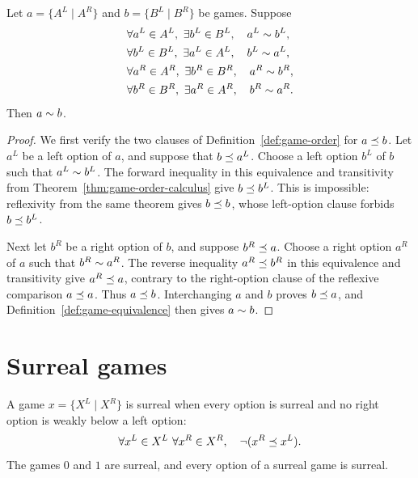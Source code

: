 \begin{theorem}
  \label{thm:option-extensionality}
  \leanok
  Let \(a=\{A^L\mid A^R\}\) and \(b=\{B^L\mid B^R\}\) be games.  Suppose
  \[
    \begin{aligned}
      &\forall a^L\in A^L,\ \exists b^L\in B^L,\quad a^L\sim b^L,\\
      &\forall b^L\in B^L,\ \exists a^L\in A^L,\quad b^L\sim a^L,\\
      &\forall a^R\in A^R,\ \exists b^R\in B^R,\quad a^R\sim b^R,\\
      &\forall b^R\in B^R,\ \exists a^R\in A^R,\quad b^R\sim a^R.
    \end{aligned}
  \]
  Then \(a\sim b\).
\end{theorem}
\begin{proof}
  \leanok
  We first verify the two clauses of Definition~\ref{def:game-order} for
  \(a\preceq b\).  Let \(a^L\) be a left option of \(a\), and suppose that
  \(b\preceq a^L\).  Choose a left option \(b^L\) of \(b\) such that
  \(a^L\sim b^L\).  The forward inequality in this equivalence and
  transitivity from Theorem~\ref{thm:game-order-calculus} give
  \(b\preceq b^L\).  This is impossible: reflexivity from the same theorem
  gives \(b\preceq b\), whose left-option clause forbids
  \(b\preceq b^L\).

  Next let \(b^R\) be a right option of \(b\), and suppose
  \(b^R\preceq a\).  Choose a right option \(a^R\) of \(a\) such that
  \(b^R\sim a^R\).  The reverse inequality \(a^R\preceq b^R\) in this
  equivalence and transitivity
  give \(a^R\preceq a\), contrary to the right-option clause of the reflexive
  comparison \(a\preceq a\).  Thus \(a\preceq b\).  Interchanging \(a\) and
  \(b\) proves \(b\preceq a\), and Definition~\ref{def:game-equivalence} then gives
  \(a\sim b\).
\end{proof}

\section{Surreal games}

\begin{definition}
  \label{def:is-surreal}
  \leanok
  A game \(x=\{X^L\mid X^R\}\) is surreal when every option is surreal and no right option is
  weakly below a left option:
  \[
    \forall x^L\in X^L\ \forall x^R\in X^R,
      \quad \neg(x^R\GameLe x^L).
  \]
  The games \(0\) and \(1\) are surreal, and every option of a surreal game is surreal.
\end{definition}

